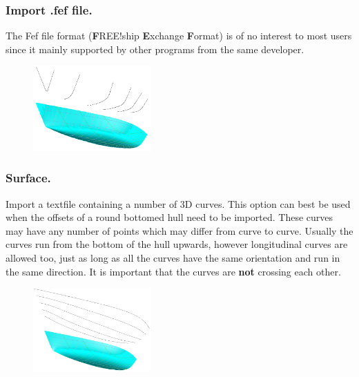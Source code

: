 \documentclass[12pt]{article}
\begin{document}
\subsubsection{Import .fef file.} \label{import-fef}
The Fef file format
(\textbf{F}REE!ship \textbf{E}xchange \textbf{F}ormat) is of no
interest to most users since it mainly supported by other programs
from the same developer.

\begin{figure}
        \centering
        \includegraphics[width=0.4\textwidth,natwidth=537,natheight=391]{filesurface.png}
        \caption{}
        \label{fig:filesurface}
\end{figure}

\subsubsection{Surface.} \label{import-surface}
Import a textfile containing a number of 3D curves. This option can
best be used when the offsets of a round bottomed hull need to be
imported. These curves may have any number of points which may differ
from curve to curve. Usually the curves run from the bottom of the
hull upwards, however longitudinal curves are allowed too, just as
long as all the curves have the same orientation and run in the same
direction. It is important that the curves are \textbf{not} crossing
each other.

\begin{figure}
        \centering
        \includegraphics[width=0.4\textwidth,natwidth=617,natheight=438]{filesurfacewaterline.png}
        \caption{}
        \label{fig:filesurfacewaterline}
\end{figure}
\end{document}

